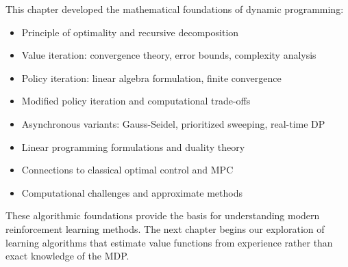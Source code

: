 This chapter developed the mathematical foundations of dynamic programming:

\begin{itemize}
    \item Principle of optimality and recursive decomposition
    \item Value iteration: convergence theory, error bounds, complexity analysis
    \item Policy iteration: linear algebra formulation, finite convergence
    \item Modified policy iteration and computational trade-offs
    \item Asynchronous variants: Gauss-Seidel, prioritized sweeping, real-time DP
    \item Linear programming formulations and duality theory
    \item Connections to classical optimal control and MPC
    \item Computational challenges and approximate methods
\end{itemize}

These algorithmic foundations provide the basis for understanding modern reinforcement learning methods. The next chapter begins our exploration of learning algorithms that estimate value functions from experience rather than exact knowledge of the MDP.